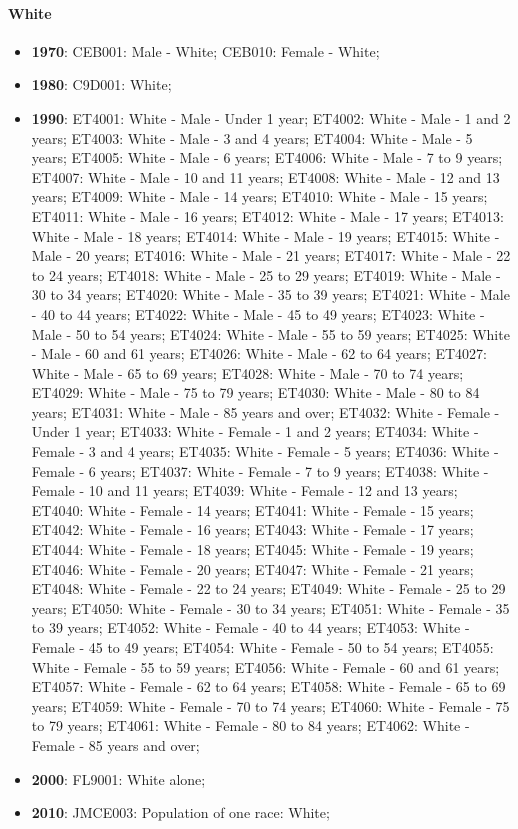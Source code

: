 \documentclass[a4paper]{article}
\begin{document}
\paragraph{White}
\begin{itemize}
   \item{\textbf{1970}:  CEB001: Male - White; CEB010: Female - White;}
   \item{\textbf{1980}:  C9D001: White;}
   \item{\textbf{1990}:  ET4001: White - Male - Under 1 year; ET4002: White - Male - 1 and 2 years; ET4003: White - Male - 3 and 4 years; ET4004: White - Male - 5 years; ET4005: White - Male - 6 years; ET4006: White - Male - 7 to 9 years; ET4007: White - Male - 10 and 11 years; ET4008: White - Male - 12 and 13 years; ET4009: White - Male - 14 years; ET4010: White - Male - 15 years; ET4011: White - Male - 16 years; ET4012: White - Male - 17 years; ET4013: White - Male - 18 years; ET4014: White - Male - 19 years; ET4015: White - Male - 20 years; ET4016: White - Male - 21 years; ET4017: White - Male - 22 to 24 years; ET4018: White - Male - 25 to 29 years; ET4019: White - Male - 30 to 34 years; ET4020: White - Male - 35 to 39 years; ET4021: White - Male - 40 to 44 years; ET4022: White - Male - 45 to 49 years; ET4023: White - Male - 50 to 54 years; ET4024: White - Male - 55 to 59 years; ET4025: White - Male - 60 and 61 years; ET4026: White - Male - 62 to 64 years; ET4027: White - Male - 65 to 69 years; ET4028: White - Male - 70 to 74 years; ET4029: White - Male - 75 to 79 years; ET4030: White - Male - 80 to 84 years; ET4031: White - Male - 85 years and over; ET4032: White - Female - Under 1 year; ET4033: White - Female - 1 and 2 years; ET4034: White - Female - 3 and 4 years; ET4035: White - Female - 5 years; ET4036: White - Female - 6 years; ET4037: White - Female - 7 to 9 years; ET4038: White - Female - 10 and 11 years; ET4039: White - Female - 12 and 13 years; ET4040: White - Female - 14 years; ET4041: White - Female - 15 years; ET4042: White - Female - 16 years; ET4043: White - Female - 17 years; ET4044: White - Female - 18 years; ET4045: White - Female - 19 years; ET4046: White - Female - 20 years; ET4047: White - Female - 21 years; ET4048: White - Female - 22 to 24 years; ET4049: White - Female - 25 to 29 years; ET4050: White - Female - 30 to 34 years; ET4051: White - Female - 35 to 39 years; ET4052: White - Female - 40 to 44 years; ET4053: White - Female - 45 to 49 years; ET4054: White - Female - 50 to 54 years; ET4055: White - Female - 55 to 59 years; ET4056: White - Female - 60 and 61 years; ET4057: White - Female - 62 to 64 years; ET4058: White - Female - 65 to 69 years; ET4059: White - Female - 70 to 74 years; ET4060: White - Female - 75 to 79 years; ET4061: White - Female - 80 to 84 years; ET4062: White - Female - 85 years and over;}
   \item{\textbf{2000}:  FL9001: White alone;}
   \item{\textbf{2010}:  JMCE003: Population of one race: White;}
\end{itemize}
\end{document}
